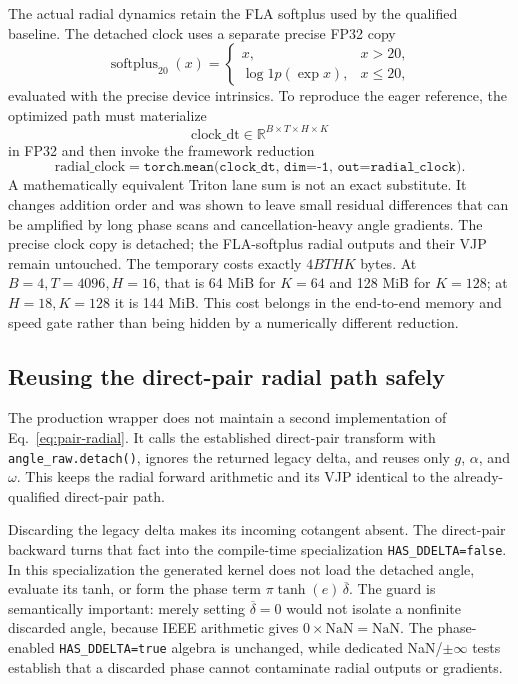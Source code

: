 \documentclass[11pt]{article}
\newcommand{\R}{\mathbb{R}}
\newcommand{\splus}{\operatorname{softplus}}
\begin{document}
The actual radial dynamics retain the FLA softplus used by the qualified baseline.  The detached
clock uses a separate precise FP32 copy
\begin{equation}
  \splus_{20}(x)=
  \begin{cases}
    x,&x>20,\\
    \log1p(\exp x),&x\leq20,
  \end{cases}
  \label{eq:precise-softplus}
\end{equation}
evaluated with the precise device intrinsics.  To reproduce the eager reference, the optimized
path must materialize
\begin{equation}
  \mathrm{clock\_dt}\in\R^{B\times T\times H\times K}
\end{equation}
in FP32 and then invoke the framework reduction
\begin{equation}
  \mathrm{radial\_clock}
  =\texttt{torch.mean(clock\_dt, dim=-1, out=radial\_clock)}.
  \label{eq:torch-mean}
\end{equation}
A mathematically equivalent Triton lane sum is not an exact substitute.  It changes addition order
and was shown to leave small residual differences that can be amplified by long phase scans and
cancellation-heavy angle gradients.  The precise clock copy is detached; the FLA-softplus radial
outputs and their VJP remain untouched.
The temporary costs exactly $4BTHK$ bytes.  At $B=4,T=4096,H=16$, that is 64 MiB for $K=64$ and
128 MiB for $K=128$; at $H=18,K=128$ it is 144 MiB.  This cost belongs in the end-to-end memory and
speed gate rather than being hidden by a numerically different reduction.

\subsection{Reusing the direct-pair radial path safely}

The production wrapper does not maintain a second implementation of Eq.~\eqref{eq:pair-radial}.
It calls the established direct-pair transform with \texttt{angle\_raw.detach()}, ignores the
returned legacy delta, and reuses only $g$, $\alpha$, and $\omega$.  This keeps the radial forward
arithmetic and its VJP identical to the already-qualified direct-pair path.

Discarding the legacy delta makes its incoming cotangent absent.  The direct-pair backward turns
that fact into the compile-time specialization \texttt{HAS\_DDELTA=false}.  In this specialization
the generated kernel does not load the detached angle, evaluate its tanh, or form the phase term
$\pi\tanh(e)\,\overline\delta$.  The guard is semantically important: merely setting
$\overline\delta=0$ would not isolate a nonfinite discarded angle, because IEEE arithmetic gives
$0\times\mathrm{NaN}=\mathrm{NaN}$.  The phase-enabled
\texttt{HAS\_DDELTA=true} algebra is unchanged, while dedicated NaN/$\pm\infty$ tests establish
that a discarded phase cannot contaminate radial outputs or gradients.
\end{document}
